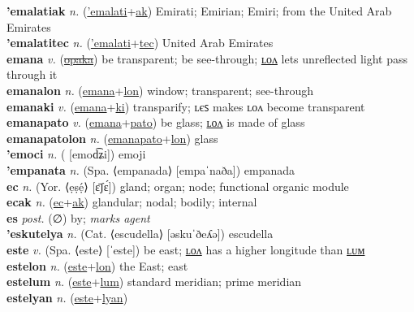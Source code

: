 \textbf{'emalatiak} \textit{n.} (\hyperref['emalati]{'emalati}+\hyperref[ak]{ak})
Emirati; Emirian; Emiri; from the United Arab Emirates \label{'emalatiak} \\
\textbf{'emalatitec} \textit{n.} (\hyperref['emalati]{'emalati}+\hyperref[tec]{tec})
United Arab Emirates \label{'emalatitec} \\
\textbf{emana} \textit{v.} (\hyperref[opaka]{\sout{opaka}})
be transparent; be see-through; \hyperref[emanalon]{ʟᴏᴧ} lets unreflected light pass through it \label{emana} \\
\textbf{emanalon} \textit{n.} (\hyperref[emana]{emana}+\hyperref[lon]{lon})
window; transparent; see-through \label{emanalon} \\
\textbf{emanaki} \textit{v.} (\hyperref[emana]{emana}+\hyperref[ki]{ki})
transparify; ʟєꜱ makes ʟᴏᴧ become transparent \label{emanaki} \\
\textbf{emanapato} \textit{v.} (\hyperref[emana]{emana}+\hyperref[pato]{pato})
be glass; \hyperref[emanapatolon]{ʟᴏᴧ} is made of glass \label{emanapato} \\
\textbf{emanapatolon} \textit{n.} (\hyperref[emanapato]{emanapato}+\hyperref[lon]{lon})
glass \label{emanapatolon} \\
\textbf{'emoci} \textit{n.} ( [emod͡ʑi])
emoji \label{'emoci} \\
\textbf{'empanata} \textit{n.} (Spa. ⟨empanada⟩ [empaˈnaða])
empanada \label{'empanata} \\
\textbf{ec} \textit{n.} (Yor. ⟨ẹṣẹ́⟩ [ɛ̄ʃɛ́])
gland; organ; node; functional organic module \label{ec} \\
\textbf{ecak} \textit{n.} (\hyperref[ec]{ec}+\hyperref[ak]{ak})
glandular; nodal; bodily; internal \label{ecak} \\
\textbf{es} \textit{post.} (∅)
by; \textit{marks agent} \label{es} \\
\textbf{'eskutelya} \textit{n.} (Cat. ⟨escudella⟩ [əskuˈðeʎə])
escudella \label{'eskutelya} \\
\textbf{este} \textit{v.} (Spa. ⟨este⟩ [ˈeste])
be east; \hyperref[estelon]{ʟᴏᴧ} has a higher longitude than \hyperref[estelum]{ʟᴜᴍ} \label{este} \\
\textbf{estelon} \textit{n.} (\hyperref[este]{este}+\hyperref[lon]{lon})
the East; east \label{estelon} \\
\textbf{estelum} \textit{n.} (\hyperref[este]{este}+\hyperref[lum]{lum})
standard meridian; prime meridian \label{estelum} \\
\textbf{estelyan} \textit{n.} (\hyperref[este]{este}+\hyperref[lyan]{lyan})

